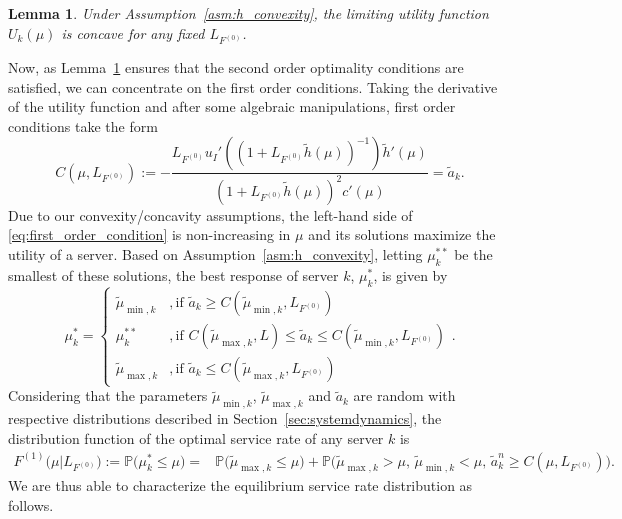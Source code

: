 \documentclass[a4paper,11pt,twoside]{article}
\numberwithin{equation}{section}
\numberwithin{figure}{section}
\theoremstyle{plain}
\newtheorem{lemma}[theorem]{Lemma}
\newcommand{\PP}{\mathbb{P}}
\newcommand{\1}{\mathbbm{1}}
\begin{document}
\begin{lemma}\label{lem:utility_concavity}
Under Assumption~\ref{asm:h_convexity}, the limiting utility function $U_k(\mu)$ is concave for any fixed $L_{F^{(0)}}$.
\end{lemma}

Now, as Lemma~\ref{lem:utility_concavity} ensures that the second order optimality conditions are satisfied, we can concentrate on the first order conditions. Taking the derivative of the utility function and after some algebraic manipulations, first order conditions take the form
\begin{equation}\label{eq:first_order_condition}
    C(\mu,L_{F^{(0)}}):=-\frac{L_{F^{(0)}}u_I'\left((1+L_{F^{(0)}}\tilde{h}(\mu))^{-1}\right)\tilde{h}'(\mu)}{(1+L_{F^{(0)}}\tilde{h}(\mu))^{2}c'(\mu)}=\tilde{a}_k.
\end{equation}
Due to our convexity/concavity assumptions, the left-hand side of \eqref{eq:first_order_condition} is non-increasing in $\mu$ and its solutions  maximize the utility of a server. Based on Assumption~\ref{asm:h_convexity}, letting $\mu_k^{**}$ be the smallest of these solutions, the best response of server $k$, $\mu_k^*$, is given by 
\begin{equation}\label{eq:best_response_server}
    \mu_k^*=
    \left\{\begin{array}{ll}
    \tilde{\mu}_{\min,k} &, \mbox{if } \tilde{a}_k\geq C(\tilde{\mu}_{\min,k}, L_{F^{(0)}})\\
    \mu_k^{**} &, \mbox{if }C(\tilde{\mu}_{\max,k}, L)\leq \tilde{a}_k \leq C(\tilde{\mu}_{\min,k}, L_{F^{(0)}})\\
    \tilde{\mu}_{\max,k} &, \mbox{if } \tilde{a}_k\leq C(\tilde{\mu}_{\max,k}, L_{F^{(0)}})
    \end{array}\right. .
\end{equation}
Considering that the parameters $\tilde{\mu}_{\min,k}$, $\tilde{\mu}_{\max,k}$ and $\tilde{a}_k$ are random with respective distributions described in Section~\ref{sec:systemdynamics}, the distribution function of the optimal service rate of any server $k$ is
\begin{align}\label{eq:distribution_function}
    F^{(1)}\big(\mu|L_{F^{(0)}}\big)
    :=
    \PP\big(\mu_k^*\leq \mu\big)
    =&\PP\big(\tilde{\mu}_{\max,k}\leq \mu\big)
    +\PP\big(\tilde{\mu}_{\max,k}>\mu,\,          
             \tilde{\mu}_{\min,k}<\mu,\, 
             \tilde{a}_k^n\geq C(\mu,L_{F^{(0)}})\big).
\end{align}
We are thus able to characterize the equilibrium service rate distribution as follows.
\end{document}
